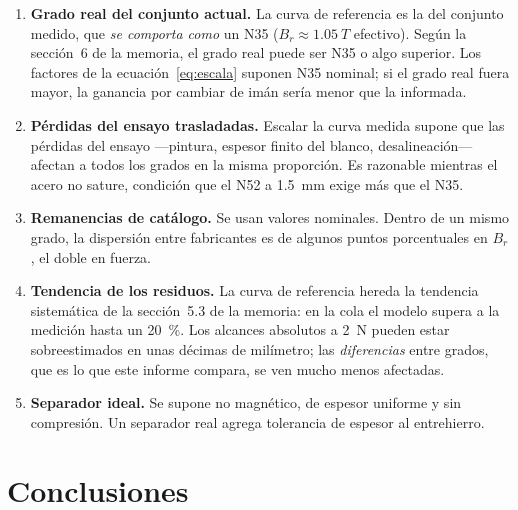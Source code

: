\documentclass[11pt,a4paper]{article}
\begin{document}
\begin{enumerate}
  \item \textbf{Grado real del conjunto actual.} La curva de referencia es la del conjunto
  medido, que \emph{se comporta como} un N35 ($B_r \approx \SI{1,05}{T}$ efectivo). Según la
  sección~6 de la memoria, el grado real puede ser N35 o algo superior. Los factores de la
  ecuación~\eqref{eq:escala} suponen N35 nominal; si el grado real fuera mayor, la ganancia por
  cambiar de imán sería menor que la informada.
  \item \textbf{Pérdidas del ensayo trasladadas.} Escalar la curva medida supone que las
  pérdidas del ensayo ---pintura, espesor finito del blanco, desalineación--- afectan a todos
  los grados en la misma proporción. Es razonable mientras el acero no sature, condición que
  el N52 a \SI{1,5}{mm} exige más que el N35.
  \item \textbf{Remanencias de catálogo.} Se usan valores nominales. Dentro de un mismo grado,
  la dispersión entre fabricantes es de algunos puntos porcentuales en $B_r$, el doble en
  fuerza.
  \item \textbf{Tendencia de los residuos.} La curva de referencia hereda la tendencia
  sistemática de la sección~5.3 de la memoria: en la cola el modelo supera a la medición hasta
  un \SI{20}{\percent}. Los alcances absolutos a \SI{2}{N} pueden estar sobreestimados en unas
  décimas de milímetro; las \emph{diferencias} entre grados, que es lo que este informe
  compara, se ven mucho menos afectadas.
  \item \textbf{Separador ideal.} Se supone no magnético, de espesor uniforme y sin
  compresión. Un separador real agrega tolerancia de espesor al entrehierro.
\end{enumerate}

\section{Conclusiones}
\end{document}
